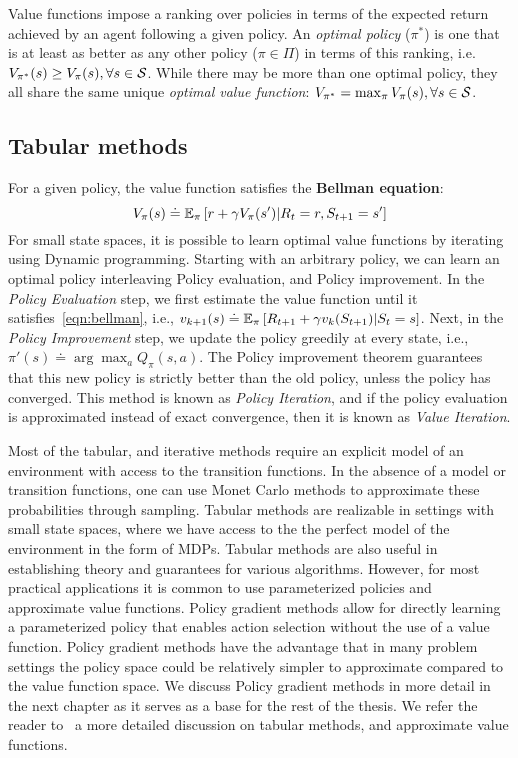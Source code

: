 Value functions impose a ranking over policies in terms of the expected return achieved by an agent
following a given policy.
An \textit{optimal policy} ($\pi^\ast$) is one that is at least as better as any other policy ($\pi
	\in \Pi$) in terms of this ranking, i.e. $V_{\pi^\ast}(s) \geq V_\pi(s), \forall s \in \mathcal{S}$.
While there may be more than one optimal policy, they all share the same unique \textit{optimal
	value function}: $V_{\pi^{\ast}} = \max_{\pi} V_\pi(s), \forall s \in \mathcal{S}$.

\subsection{Tabular methods}
For a given policy, the value function satisfies the \textbf{Bellman equation}:
\begin{equation}
	\label{eqn:bellman} V_\pi(s) \doteq \mathbb{E}_\pi \left[r + \gamma V_\pi(s') | R_t = r, S_{t+1} = s'
		\right]
\end{equation} For small state spaces, it is possible to learn optimal value functions by
iterating using Dynamic programming.
Starting with an arbitrary policy, we can learn an optimal policy interleaving Policy evaluation,
and Policy improvement.
In the \textit{Policy Evaluation} step, we first estimate the value function until it
satisfies~\ref{eqn:bellman}, i.e., $v_{k+1}(s) \doteq \mathbb{E}_\pi \left[R_{t+1} + \gamma v_k(S_{t+1})
		|S_t =s\right]$.
Next, in the \textit{Policy Improvement} step, we update the policy greedily at every state, i.e.,
$\pi'(s) \doteq \arg \max_{a} Q_\pi(s,a)$.
The Policy improvement theorem guarantees that this new policy is strictly better than the old
policy, unless the policy has converged.
This method is known as \textit{Policy Iteration}, and if the policy evaluation is approximated
instead of exact convergence, then it is known as \textit{Value Iteration}.

Most of the tabular, and iterative methods require an explicit model of an environment with access
to the transition functions.
In the absence of a model or transition functions, one can use Monet Carlo methods to approximate
these probabilities through sampling.
Tabular methods are realizable in settings with small state spaces, where we have access to the the
perfect model of the environment in the form of MDPs.
Tabular methods are also useful in establishing theory and guarantees for various algorithms.
However, for most practical applications it is common to use parameterized policies and approximate
value functions.
Policy gradient methods allow for directly learning a parameterized policy that enables action
selection without the use of a value function.
Policy gradient methods have the advantage that in many problem settings the policy space could be
relatively simpler to approximate compared to the value function space.
We discuss Policy gradient methods in more detail in the next chapter as it serves as a base for
the rest of the thesis.
We refer the reader to~\cite{suttonReinforcement2018} a more detailed discussion on tabular
methods, and approximate value functions.

